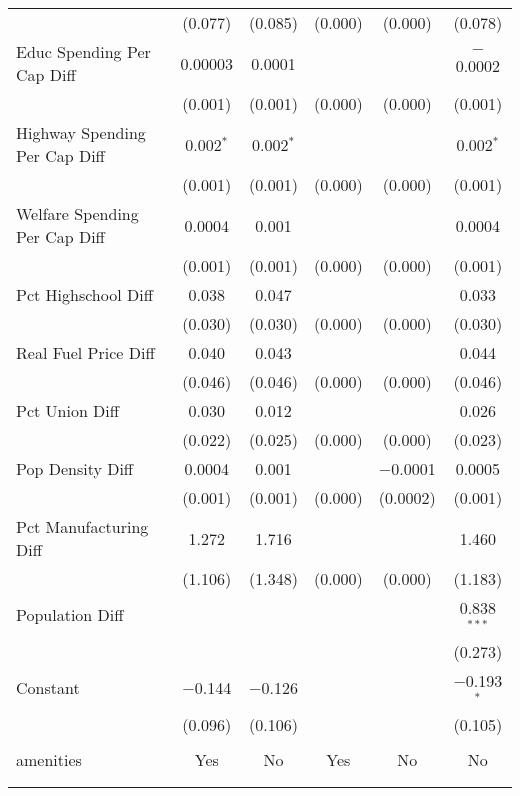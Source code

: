 \begin{table}[!htbp]
\begin{tabular}{@{\extracolsep{5pt}}lccccc}
  & (0.077) & (0.085) & (0.000) & (0.000) & (0.078) \\ 
  Educ Spending Per Cap Diff & 0.00003 & 0.0001 &  &  & $-$0.0002 \\ 
  & (0.001) & (0.001) & (0.000) & (0.000) & (0.001) \\ 
  Highway Spending Per Cap Diff & 0.002$^{*}$ & 0.002$^{*}$ &  &  & 0.002$^{*}$ \\ 
  & (0.001) & (0.001) & (0.000) & (0.000) & (0.001) \\ 
  Welfare Spending Per Cap Diff & 0.0004 & 0.001 &  &  & 0.0004 \\ 
  & (0.001) & (0.001) & (0.000) & (0.000) & (0.001) \\ 
  Pct Highschool Diff & 0.038 & 0.047 &  &  & 0.033 \\ 
  & (0.030) & (0.030) & (0.000) & (0.000) & (0.030) \\ 
  Real Fuel Price Diff & 0.040 & 0.043 &  &  & 0.044 \\ 
  & (0.046) & (0.046) & (0.000) & (0.000) & (0.046) \\ 
  Pct Union Diff & 0.030 & 0.012 &  &  & 0.026 \\ 
  & (0.022) & (0.025) & (0.000) & (0.000) & (0.023) \\ 
  Pop Density Diff & 0.0004 & 0.001 &  & $-$0.0001 & 0.0005 \\ 
  & (0.001) & (0.001) & (0.000) & (0.0002) & (0.001) \\ 
  Pct Manufacturing Diff & 1.272 & 1.716 &  &  & 1.460 \\ 
  & (1.106) & (1.348) & (0.000) & (0.000) & (1.183) \\ 
  Population Diff &  &  &  &  & 0.838$^{***}$ \\ 
  &  &  &  &  & (0.273) \\ 
  Constant & $-$0.144 & $-$0.126 &  &  & $-$0.193$^{*}$ \\ 
  & (0.096) & (0.106) &  &  & (0.105) \\ 
 \hline \\[-1.8ex] 
amenities & Yes & No & Yes & No & No \\ 
\hline \\[-1.8ex] 
\hline 
\hline \\[-1.8ex] 
\end{tabular} 
\end{table} 
